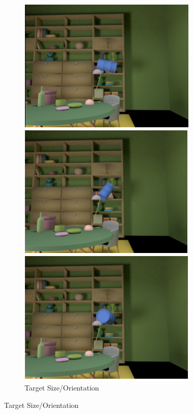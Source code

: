 \documentclass{jov}
\begin{document}
\begin{figure}
\begin{subfigure}[b]{0.18 \textwidth}
        \label{fig:targetPositionVariation}
    \end{subfigure}
    ~
	\begin{subfigure}[b]{0.18 \textwidth}
    \centering
        \caption{Target Size/Orientation}
        \includegraphics[width=\textwidth]{../Figures/Figure5/Figure5_e.png}

\end{subfigure}
\end{figure}
\end{document}
